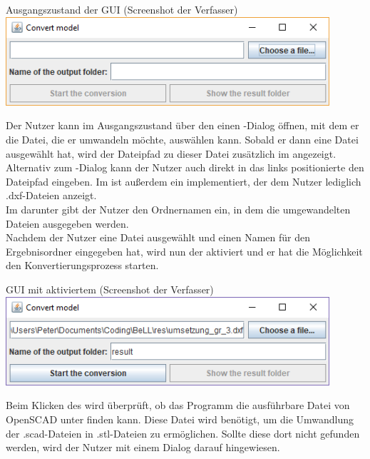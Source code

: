 \begin{Bild}{Ausgangszustand der GUI (Screenshot der Verfasser)}
	\includegraphics[width = 120mm]{Bilder/GUI/GUI_Startup}
\end{Bild}

Der Nutzer kann im Ausgangszustand über den  einen -Dialog öffnen, mit dem er die Datei, die er umwandeln möchte, auswählen kann.
Sobald er dann eine Datei ausgewählt hat, wird der Dateipfad zu dieser Datei zusätzlich im  angezeigt.
Alternativ zum -Dialog kann der Nutzer auch direkt in das links positionierte  den Dateipfad eingeben.
Im  ist außerdem ein  implementiert, der dem Nutzer lediglich .dxf-Dateien anzeigt. \\
Im  darunter gibt der Nutzer den Ordnernamen ein, in dem die umgewandelten Dateien ausgegeben werden. \\
Nachdem der Nutzer eine Datei ausgewählt und einen Namen für den Ergebnisordner eingegeben hat, wird nun der  aktiviert und er hat die Möglichkeit den Konvertierungsprozess starten.

\begin{Bild}{GUI mit aktiviertem  (Screenshot der Verfasser)}
	\includegraphics[width = 120mm]{Bilder/GUI/GUI_Convert_Ready}
\end{Bild}

Beim Klicken des  wird überprüft, ob das Programm die ausführbare Datei von OpenSCAD unter  finden kann.
Diese Datei wird benötigt, um die Umwandlung der .scad-Dateien in .stl-Dateien zu ermöglichen.
Sollte diese dort nicht gefunden werden, wird der Nutzer mit einem Dialog darauf hingewiesen.

